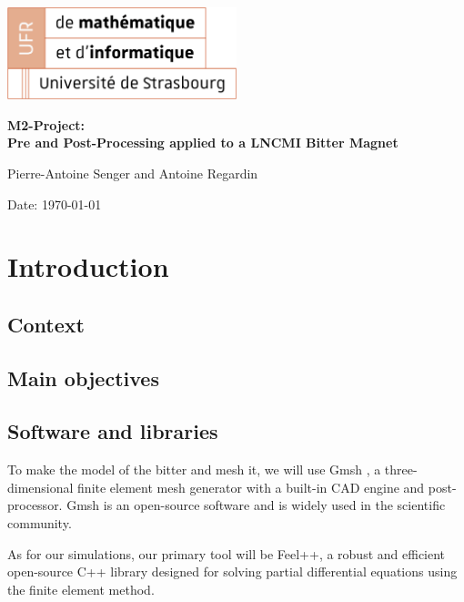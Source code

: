 \documentclass[12pt]{article}
\begin{document}
\begin{titlepage}
\centering
\includegraphics[width=0.5\textwidth]{images/logo-ufr.png}\par\vspace{1cm}
\vspace{1.5cm}
{\huge\bfseries M2-Project: \\
Pre and Post-Processing applied to a LNCMI Bitter Magnet\par}
\vspace{2cm}
{\Large Pierre-Antoine Senger and Antoine Regardin\par}
\vfill


\vfill

{\large Date: \today\par}
\end{titlepage}

\tableofcontents

\newpage

\section{Introduction}

\subsection{Context}

\subsection{Main objectives}

\subsection{Software and libraries}
To make the model of the bitter and mesh it, we will use Gmsh \cite{gmsh}, a three-dimensional
 finite element mesh generator with a built-in CAD engine and post-processor. 
Gmsh is an open-source software and is widely used in the scientific
community.

As for our simulations, our primary tool will be Feel++\cite{feelpp}, a robust and 
efficient open-source C++ library designed for solving partial differential equations using 
the finite element method\cite{fem}.
\end{document}
